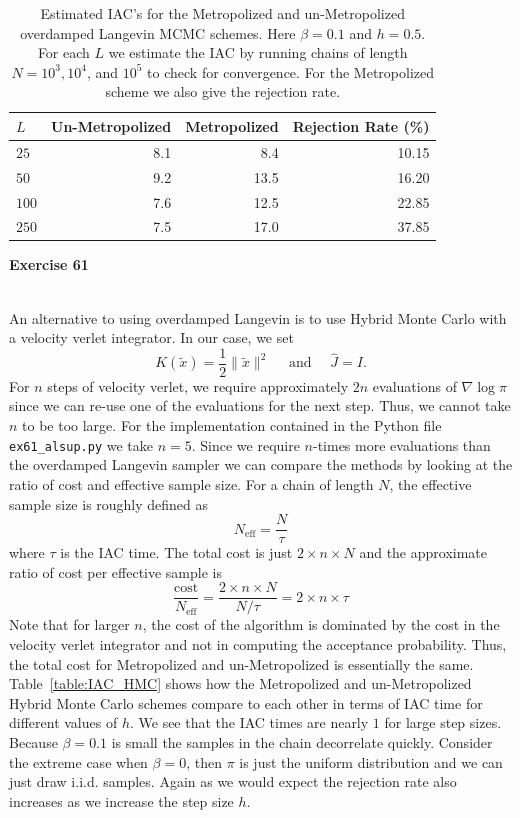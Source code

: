 \documentclass[11pt,a4paper]{amsart}
\begin{document}
\begin{table}[H]
\centering
\begin{tabular}{l | r r r}
$L$ & Un-Metropolized & Metropolized & Rejection Rate (\%) \\
\hline
$25 $ & 8.1 & 8.4 & 10.15\\
$50$ & 9.2 & 13.5 & 16.20 \\
$100$ & 7.6 & 12.5 & 22.85 \\
$250$ & 7.5 & 17.0 & 37.85
\end{tabular}
\caption{Estimated IAC's for the Metropolized and un-Metropolized overdamped Langevin MCMC schemes.  Here $\beta=0.1$ and $h=0.5$.  For each $L$ we estimate the IAC by running chains of length $N = 10^3,10^4$, and $10^5$ to check for convergence.  For the Metropolized scheme we also give the rejection rate.}
\label{table:IAC_OL_L}
\end{table}



{\bf Exercise 61}\\
\\
\par An alternative to using overdamped Langevin is to use Hybrid Monte Carlo with a velocity verlet integrator.  In our case, we set
\[
K(\tilde{x}) = \frac{1}{2}\|\tilde{x}\|^2 \quad \text{ and } \quad \hat{J} = I.
\]
For $n$ steps of velocity verlet, we require approximately $2n$ evaluations of $\nabla \log \pi$ since we can re-use one of the evaluations for the next step.  Thus, we cannot take $n$ to be too large.  For the implementation contained in the Python file {\tt ex61\_alsup.py} we take $n=5$.  Since we require $n$-times more evaluations than the overdamped Langevin sampler we can compare the methods by looking at the ratio of cost and effective sample size.  For a chain of length $N$, the effective sample size is roughly defined as
\[
N_{\text{eff}} = \frac{N}{\tau}
\]
where $\tau$ is the IAC time.  The total cost is just $2 \times n \times N$ and the approximate ratio of cost per effective sample is 
\[
\frac{\text{cost}}{N_{\text{eff}}} = \frac{2\times n \times N}{N/\tau} = 2\times n \times \tau
\]
Note that for larger $n$, the cost of the algorithm is dominated by the cost in the velocity verlet integrator and not in computing the acceptance probability.  Thus, the total cost for Metropolized and un-Metropolized is essentially the same. Table~\ref{table:IAC_HMC} shows how the Metropolized and un-Metropolized Hybrid Monte Carlo schemes compare to each other in terms of IAC time for different values of $h$.  We see that the IAC times are nearly $1$ for large step sizes.  Because $\beta = 0.1$ is small the samples in the chain decorrelate quickly.  Consider the extreme case when $\beta = 0$, then $\pi$ is just the uniform distribution and we can just draw i.i.d. samples.  Again as we would expect the rejection rate also increases as we increase the step size $h$.
\end{document}
